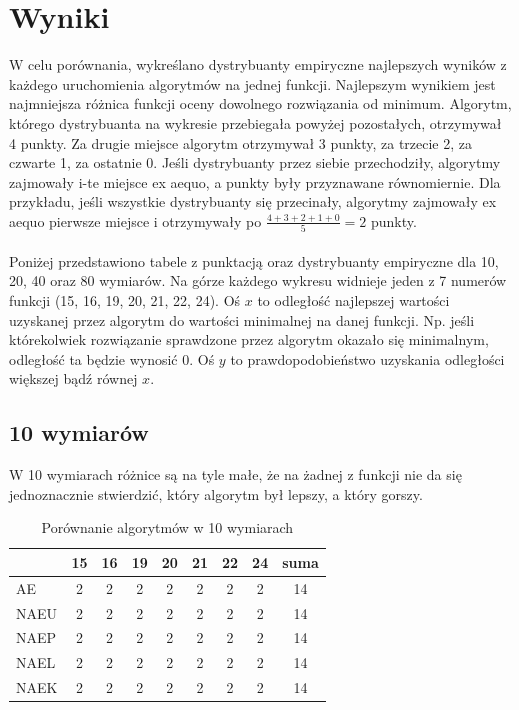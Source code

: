 \documentclass[12pt, a4paper]{article}
\begin{document}
\section{Wyniki}

W celu porównania, wykreślano dystrybuanty empiryczne najlepszych wyników z każdego uruchomienia 
algorytmów na jednej funkcji. Najlepszym wynikiem jest najmniejsza różnica funkcji oceny dowolnego rozwiązania od minimum.
Algorytm, którego dystrybuanta na wykresie przebiegała powyżej pozostałych, otrzymywał 4 punkty. 
Za drugie miejsce algorytm otrzymywał 3 punkty, za trzecie 2, za czwarte 1, za ostatnie 0. 
Jeśli dystrybuanty przez siebie przechodziły, algorytmy zajmowały i-te miejsce ex aequo, a punkty były przyznawane równomiernie.
Dla przykładu, jeśli wszystkie dystrybuanty się przecinały, algorytmy zajmowały ex aequo pierwsze miejsce i otrzymywały po
$\frac{4+3+2+1+0}{5}=2$ punkty. \\
\\
Poniżej przedstawiono tabele z punktacją oraz dystrybuanty empiryczne dla 10, 20, 40 oraz 80 wymiarów.
Na górze każdego wykresu widnieje jeden z 7 numerów funkcji (15, 16, 19, 20, 21, 22, 24).
Oś $x$ to odległość najlepszej wartości uzyskanej przez algorytm do
wartości minimalnej na danej funkcji. Np. jeśli którekolwiek rozwiązanie sprawdzone przez 
algorytm okazało się minimalnym, odległość ta będzie wynosić 0. Oś $y$ to prawdopodobieństwo
uzyskania odległości większej bądź równej $x$.

\subsection{10 wymiarów}

W 10 wymiarach różnice są na tyle małe, że na żadnej z funkcji nie da się jednoznacznie stwierdzić,
który algorytm był lepszy, a który gorszy.

\begin{table}[H]
\centering
\begin{tabular}{ l | c | c | c | c | c | c | c | c}
         & 15 & 16 & 19 & 20 & 21 & 22 & 24 & suma \\ \hline
AE       & 2  & 2  & 2  & 2  & 2  & 2  & 2  & 14   \\ 
NAEU     & 2  & 2  & 2  & 2  & 2  & 2  & 2  & 14   \\ 
NAEP     & 2  & 2  & 2  & 2  & 2  & 2  & 2  & 14   \\ 
NAEL     & 2  & 2  & 2  & 2  & 2  & 2  & 2  & 14   \\
NAEK     & 2  & 2  & 2  & 2  & 2  & 2  & 2  & 14   \\ 
\end{tabular}
\caption{Porównanie algorytmów w 10 wymiarach}
\label{table:10d}
\end{table}
\end{document}
